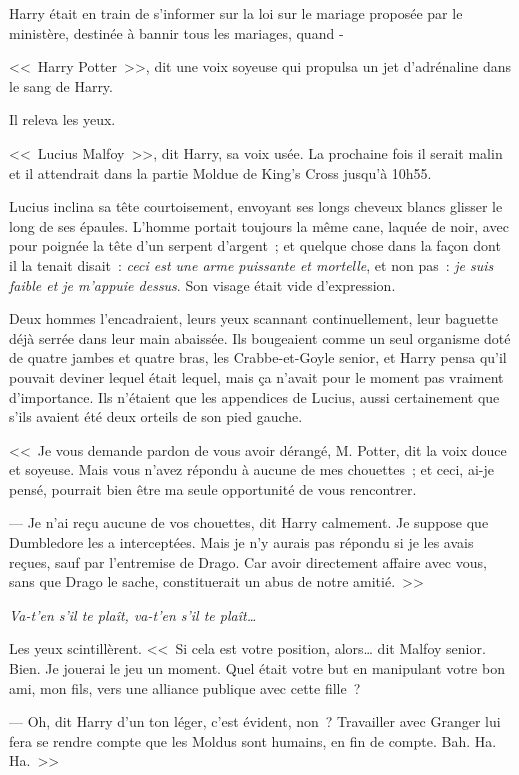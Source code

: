 Harry était en train de s'informer sur la loi sur le mariage proposée par le ministère, destinée à bannir tous les mariages, quand -

<<~Harry Potter~>>, dit une voix soyeuse qui propulsa un jet d'adrénaline dans le sang de Harry.

Il releva les yeux.

<<~Lucius Malfoy~>>, dit Harry, sa voix usée. La prochaine fois il serait malin et il attendrait dans la partie Moldue de King's Cross jusqu'à 10h55.

Lucius inclina sa tête courtoisement, envoyant ses longs cheveux blancs glisser le long de ses épaules. L'homme portait toujours la même cane, laquée de noir, avec pour poignée la tête d'un serpent d'argent~; et quelque chose dans la façon dont il la tenait disait~: \emph{ceci est une arme puissante et mortelle}, et non pas~: \emph{je suis faible et je m'appuie dessus}. Son visage était vide d'expression.

Deux hommes l'encadraient, leurs yeux scannant continuellement, leur baguette déjà serrée dans leur main abaissée. Ils bougeaient comme un seul organisme doté de quatre jambes et quatre bras, les Crabbe-et-Goyle senior, et Harry pensa qu'il pouvait deviner lequel était lequel, mais ça n'avait pour le moment pas vraiment d'importance. Ils n'étaient que les appendices de Lucius, aussi certainement que s'ils avaient été deux orteils de son pied gauche.

<<~Je vous demande pardon de vous avoir dérangé, M. Potter, dit la voix douce et soyeuse. Mais vous n'avez répondu à aucune de mes chouettes~; et ceci, ai-je pensé, pourrait bien être ma seule opportunité de vous rencontrer.

--- Je n'ai reçu aucune de vos chouettes, dit Harry calmement. Je suppose que Dumbledore les a interceptées. Mais je n'y aurais pas répondu si je les avais reçues, sauf par l'entremise de Drago. Car avoir directement affaire avec vous, sans que Drago le sache, constituerait un abus de notre amitié.~>>

\emph{Va-t'en s'il te plaît, va-t'en s'il te plaît…}

Les yeux scintillèrent. <<~Si cela est votre position, alors… dit Malfoy senior. Bien. Je jouerai le jeu un moment. Quel était votre but en manipulant votre bon ami, mon fils, vers une alliance publique avec cette fille~?

--- Oh, dit Harry d'un ton léger, c'est évident, non~? Travailler avec Granger lui fera se rendre compte que les Moldus sont humains, en fin de compte. Bah. Ha. Ha.~>>

